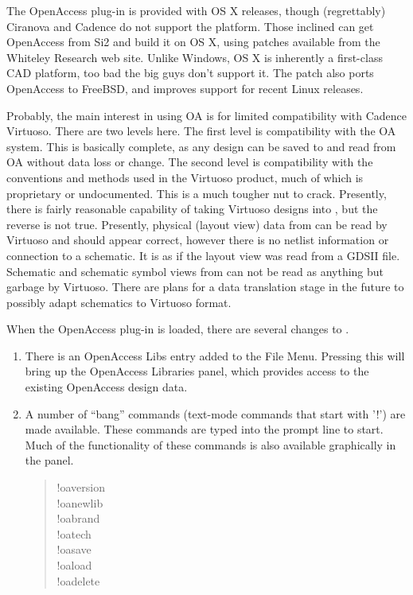 The OpenAccess plug-in is provided with OS X releases, though
(regrettably) Ciranova and Cadence do not support the platform.  Those
inclined can get OpenAccess from Si2 and build it on OS X, using
patches available from the Whiteley Research web site.  Unlike
Windows, OS X is inherently a first-class CAD platform, too bad the
big guys don't support it.  The patch also ports OpenAccess to
FreeBSD, and improves support for recent Linux releases.

Probably, the main interest in using OA is for limited compatibility
with Cadence Virtuoso.  There are two levels here.  The first level is
compatibility with the OA system.  This is basically complete, as any
{\Xic} design can be saved to and read from OA without data loss or
change.  The second level is compatibility with the conventions and
methods used in the Virtuoso product, much of which is proprietary or
undocumented.  This is a much tougher nut to crack.  Presently, there
is fairly reasonable capability of taking Virtuoso designs into
{\Xic}, but the reverse is not true.  Presently, physical (layout
view) data from {\Xic} can be read by Virtuoso and should appear
correct, however there is no netlist information or connection to a
schematic.  It is as if the layout view was read from a GDSII file. 
Schematic and schematic symbol views from {\Xic} can not be read as
anything but garbage by Virtuoso.  There are plans for a data
translation stage in the future to possibly adapt {\Xic} schematics to
Virtuoso format.

When the OpenAccess plug-in is loaded, there are several changes to
{\Xic}.

\begin{enumerate}
\item{There is an {\cb OpenAccess Libs} entry added to the {\cb File
Menu}.  Pressing this will bring up the {\cb OpenAccess Libraries}
panel, which provides access to the existing OpenAccess design data.}

\item{A number of ``bang'' commands (text-mode commands that start
with '!') are made available.  These commands are typed into the
prompt line to start.  Much of the functionality of these commands is
also available graphically in the panel.
\begin{quote}
{\cb !oaversion}\\
{\cb !oanewlib}\\
{\cb !oabrand}\\
{\cb !oatech}\\
{\cb !oasave}\\
{\cb !oaload}\\
{\cb !oadelete}
\end{quote}
}
\end{enumerate}

